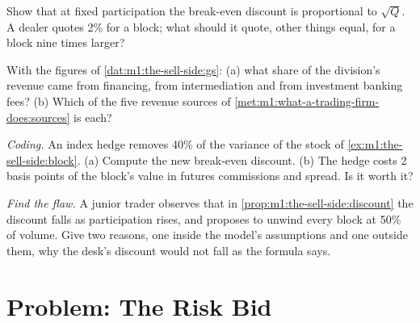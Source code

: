 \begin{exercise}[$\star\star$]\label{exo:m1:the-sell-side:5}
Show that at fixed participation the break-even discount is proportional to
$\sqrt{Q}$. A dealer quotes 2\% for a block; what should it quote, other
things equal, for a block nine times larger?
\end{exercise}

\begin{exercise}[$\star\star$]\label{exo:m1:the-sell-side:6}
With the figures of \cref{dat:m1:the-sell-side:gs}: (a) what share of the
division's revenue came from financing, from intermediation and from
investment banking fees? (b) Which of the five revenue sources of
\cref{met:m1:what-a-trading-firm-does:sources} is each?
\end{exercise}

\begin{exercise}[$\star\star\star$]\label{exo:m1:the-sell-side:7}
\emph{Coding.} An index hedge removes 40\% of the variance of the stock of
\cref{ex:m1:the-sell-side:block}. (a) Compute the new break-even discount.
(b) The hedge costs 2 basis points of the block's value in futures
commissions and spread. Is it worth it?
\end{exercise}

\begin{exercise}[$\star\star\star$]\label{exo:m1:the-sell-side:8}
\emph{Find the flaw.} A junior trader observes that in
\cref{prop:m1:the-sell-side:discount} the discount falls as participation
rises, and proposes to unwind every block at 50\% of volume. Give two
reasons, one inside the model's assumptions and one outside them, why the
desk's discount would not fall as the formula says.
\end{exercise}

\section{Problem: The Risk Bid}


